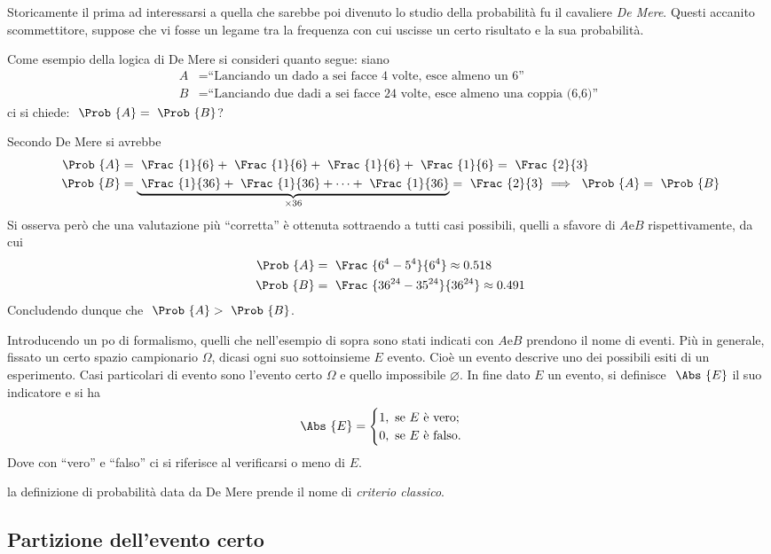 \documentclass{subfiles}
\begin{document}
Storicamente il prima ad interessarsi a quella che sarebbe poi divenuto lo studio della probabilità fu il cavaliere \emph{De Mere}.
Questi accanito scommettitore, suppose che vi fosse un legame tra la frequenza con cui uscisse un certo risultato e la sua probabilità.
\begin{Example*}
    Come esempio della logica di De Mere si consideri quanto segue: siano
    \[\begin{aligned}
            A & = \text{``Lanciando un dado a sei facce 4 volte, esce almeno un 6''}               \\
            B & = \text{``Lanciando due dadi a sei facce 24 volte, esce almeno una coppia (6,6)''}
        \end{aligned}\]
    ci si chiede: \(\Prob{A} = \Prob{B}\)?

    Secondo De Mere si avrebbe
    \[\begin{aligned}
            \Prob{A} & = \Frac{1}{6} + \Frac{1}{6} + \Frac{1}{6} + \Frac{1}{6} = \Frac{2}{3}                                                     \\
            \Prob{B} & = \underbrace{\Frac{1}{36} + \Frac{1}{36} + \cdots + \Frac{1}{36}}_{\times 36} = \Frac{2}{3} \implies \Prob{A} = \Prob{B}
        \end{aligned}\]
    Si osserva però che una valutazione più ``corretta'' è ottenuta sottraendo a tutti casi possibili, quelli a sfavore di \(A \text{e} B\) rispettivamente,
    da cui
    \[\begin{aligned}
            \Prob{A} & = \Frac{6^{4} - 5^{4}}{6^{4}} \approx 0.518       \\
            \Prob{B} & = \Frac{36^{24} - 35^{24}}{36^{24}} \approx 0.491
        \end{aligned}\]
    Concludendo dunque che \(\Prob{A} > \Prob{B}\).
\end{Example*}

Introducendo un po di formalismo, quelli che nell'esempio di sopra sono stati indicati con \(A \text{e} B\) prendono il nome di eventi.
Più in generale, fissato un certo spazio campionario \(\Omega\), dicasi ogni suo sottoinsieme \(E\) evento.
Cioè un evento descrive uno dei possibili esiti di un esperimento.
Casi particolari di evento sono l'evento certo \(\Omega\) e quello impossibile \(\varnothing\).
In fine dato \(E\) un evento, si definisce \(\Abs{E}\) il suo indicatore e si ha
\[\Abs{E} = \begin{cases}
        1, \text{se \(E\) è vero;} \\
        0, \text{se \(E\) è falso.}
    \end{cases}\]
Dove con ``vero'' e ``falso'' ci si riferisce al verificarsi o meno di \(E\).

\begin{Note*}
    la definizione di probabilità data da De Mere prende il nome di \emph{criterio classico}.
\end{Note*}

\subsection{Partizione dell'evento certo}

\end{document}
